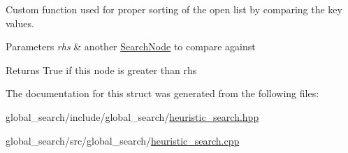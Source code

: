 Custom function used for proper sorting of the open list by comparing the key values. 


\begin{DoxyParams}{Parameters}
{\em rhs} & another \hyperlink{structhsearch_1_1SearchNode}{Search\+Node} to compare against \\
\hline
\end{DoxyParams}
\begin{DoxyReturn}{Returns}
True if this node is greater than rhs 
\end{DoxyReturn}


The documentation for this struct was generated from the following files\+:\begin{DoxyCompactItemize}
\item 
global\+\_\+search/include/global\+\_\+search/\hyperlink{heuristic__search_8hpp}{heuristic\+\_\+search.\+hpp}\item 
global\+\_\+search/src/global\+\_\+search/\hyperlink{heuristic__search_8cpp}{heuristic\+\_\+search.\+cpp}\end{DoxyCompactItemize}

